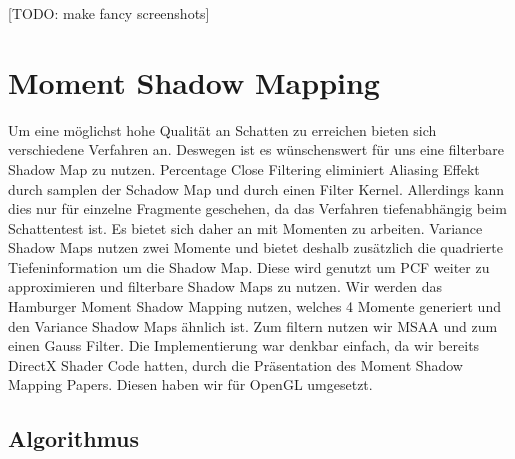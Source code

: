 \documentclass[runningheaders,a4paper]{llncs}
\begin{document}
[TODO: make fancy screenshots]

\section{Moment Shadow Mapping}
Um eine möglichst hohe Qualität an Schatten zu erreichen bieten sich verschiedene Verfahren an. Deswegen ist es wünschenswert für uns eine filterbare Shadow Map zu nutzen. 
Percentage Close Filtering eliminiert Aliasing Effekt durch samplen der Schadow Map und durch einen Filter Kernel.\cite{reeves1987rendering}
Allerdings kann dies nur für einzelne Fragmente geschehen, da das Verfahren tiefenabhängig beim Schattentest ist.\cite{reeves1987rendering}
Es bietet sich daher an mit Momenten zu arbeiten. Variance Shadow Maps nutzen zwei Momente und bietet deshalb zusätzlich die quadrierte Tiefeninformation um die Shadow Map. Diese wird genutzt um PCF weiter zu approximieren und filterbare Shadow Maps zu nutzen.\cite{donnelly2006variance}
Wir werden das Hamburger Moment Shadow Mapping nutzen, welches 4 Momente generiert und den Variance Shadow Maps ähnlich ist. Zum filtern nutzen wir MSAA und zum einen Gauss Filter. Die Implementierung war denkbar einfach, da wir bereits DirectX Shader Code hatten, durch die Präsentation des Moment Shadow Mapping Papers\cite{msm}. Diesen haben wir für OpenGL umgesetzt.

\subsection{Algorithmus}
\end{document}
